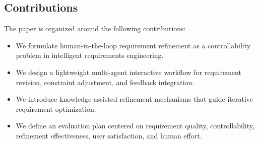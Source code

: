 \subsection{Contributions}
\label{subsec:intro-contributions}
The paper is organized around the following contributions:
\begin{itemize}[leftmargin=*]
  \item We formulate human-in-the-loop requirement refinement as a controllability problem in intelligent requirements engineering.
  \item We design a lightweight multi-agent interactive workflow for requirement revision, constraint adjustment, and feedback integration.
  \item We introduce knowledge-assisted refinement mechanisms that guide iterative requirement optimization.
  \item We define an evaluation plan centered on requirement quality, controllability, refinement effectiveness, user satisfaction, and human effort.
\end{itemize}
